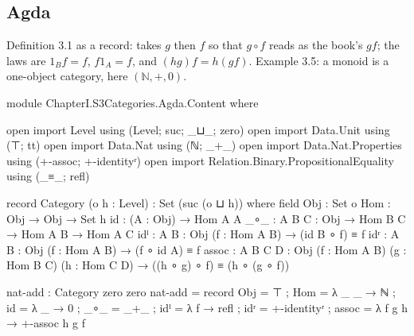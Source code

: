 \subsection*{Agda}

Definition 3.1 as a record:  takes \(g\) then \(f\) so that
\(g ∘ f\) reads as the book's \(gf\); the laws are \(1_B f = f\),
\(f 1_A = f\), and \((hg)f = h(gf)\). Example 3.5: a monoid is a one-object
category, here \((ℕ, +, 0)\).

\begin{code}
module ChapterI.S3Categories.Agda.Content where

open import Level using (Level; suc; _⊔_; zero)
open import Data.Unit using (⊤; tt)
open import Data.Nat using (ℕ; _+_)
open import Data.Nat.Properties using (+-assoc; +-identityʳ)
open import Relation.Binary.PropositionalEquality using (_≡_; refl)

record Category (o h : Level) : Set (suc (o ⊔ h)) where
  field
    Obj   : Set o
    Hom   : Obj → Obj → Set h
    id    : (A : Obj) → Hom A A
    _∘_   : {A B C : Obj} → Hom B C → Hom A B → Hom A C
    idˡ   : {A B : Obj} (f : Hom A B) → (id B ∘ f) ≡ f
    idʳ   : {A B : Obj} (f : Hom A B) → (f ∘ id A) ≡ f
    assoc : {A B C D : Obj} (f : Hom A B) (g : Hom B C) (h : Hom C D) →
            ((h ∘ g) ∘ f) ≡ (h ∘ (g ∘ f))

nat-add : Category zero zero
nat-add = record
  { Obj   = ⊤
  ; Hom   = λ _ _ → ℕ
  ; id    = λ _ → 0
  ; _∘_   = _+_
  ; idˡ   = λ f → refl
  ; idʳ   = +-identityʳ
  ; assoc = λ f g h → +-assoc h g f
  }
\end{code}
